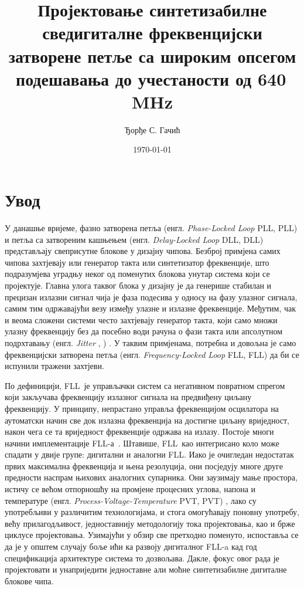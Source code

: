 \documentclass[master]{finthesis}
\title{Пројектовање синтетизабилне сведигиталне фреквенцијски затворене петље са широким опсегом подешавања до учестаности од 640\texorpdfstring{\,}{ }MHz}
\author{Ђорђе С. Гачић}
\date{\today}
\makeatletter
\newcommand*{\engl}[2][\@empty]{%
    \edef\theacronym{#1}%
    (енгл. \foreignlanguage{english}{\emph{#2}%
    \ifx\theacronym\@empty \else , #1\fi})%
}
\def \FLL  {FLL} %
\makeatother
\begin{document}
\maketitle

\tableofcontents

\makeabstract

\section{Увод}
У данашње вријеме, фазно затворена петља \engl[PLL]{Phase-Locked Loop} и петља са затвореним кашњењем \engl[DLL]{Delay-Locked Loop} представљају свеприсутне блокове у дизајну чипова. Безброј примјена самих чипова захтјевају или генератор такта или синтетизатор фреквенције, што подразумјева уградњу неког од поменутих блокова унутар система који се пројектује. Главна улога таквог блока у дизајну је да генерише стабилан и прецизан излазни сигнал чија је фаза подесива у односу на фазу улазног сигнала, самим тим одржавајући везу између улазне и излазне фреквенције. Међутим, чак и веома сложени системи често захтјевају генератор такта, који само множи улазну фреквенцију без да посебно води рачуна о фази такта или апсолутном подрхтавању \engl{Jitter}. У таквим примјенама, потребна и довољна је само фреквенцијски затворена петља \engl[FLL]{Frequency-Locked Loop} да би се испунили тражени захтјеви.

По дефиницији, \FLL\ је управљачки систем са негативном повратном спрегом који закључава фреквенцију излазног сигнала на предвиђену циљану фреквенцију. У принципу, непрастано управља фреквенцијом осцилатора на аутоматски начин све док излазна фреквенција на достигне циљану вриједност, након чега се та вриједност фреквенције одржава на излазу. Постоје многи начини имплементације \FLL-а~\cite{Ali:9097205}. Штавише, \FLL\ као интегрисано коло може спадати у двије групе: дигитални и аналогни \FLL. Иако је очигледан недостатак првих максимална фреквенција и њена резолуција, они посједују многе друге предности наспрам њихових аналогних супарника. Они заузимају мање простора, истичу се већом отпорношћу на промјене процесних углова, напона и температуре \engl[PVT]{Process-Voltage-Temperature}, лако су употребљиви у различитим технологијама, и стога омогућавају поновну употребу, већу прилагодљивост, једноставнију методологију тока пројектовања, као и брже циклусе пројектовања. Узимајући у обзир све претходно поменуто, испоставља се да је у општем случају боље ићи ка развоју дигиталног \FLL-a кад год спецификација архитектуре система то дозвољава. Дакле, фокус овог рада је пројектовати и унаприједити једноставне али моћне синтетизабилне дигиталне блокове чипа.
\end{document}
